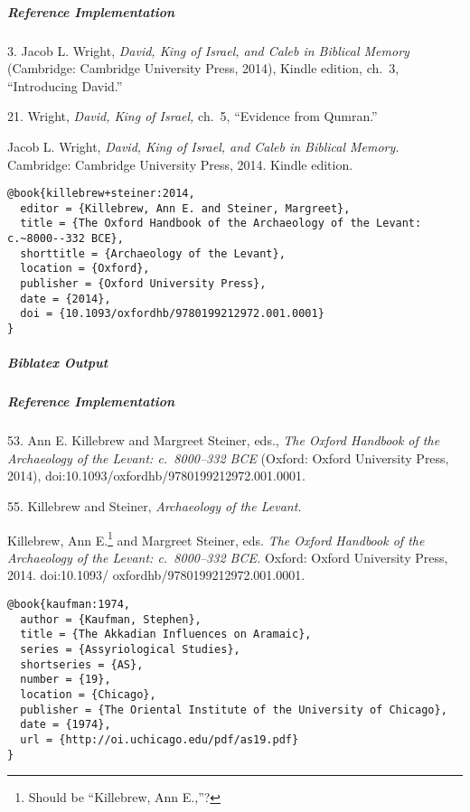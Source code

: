 \documentclass[a4paper]{article}
\newenvironment{biboutput}{%
  \subparagraph{Biblatex Output}
}{\color{black}}
\newenvironment{refimp}{%
  \subparagraph{Reference Implementation}
  \color{reference-colour}
  \rm
}{\par\color{black}}
\begin{document}
\begin{refimp}
  \hspace*{\bibindent}3. Jacob L. Wright, \emph{David, King of Israel, and
  Caleb in Biblical Memory} (Cambridge: Cambridge University Press, 2014),
  Kindle edition, ch.~3, “Introducing David.”

  \hspace*{\bibindent}21. Wright, \emph{David, King of Israel,} ch.~5,
  “Evidence from Qumran.”

  \hangindent\bibindent Jacob L. Wright, \emph{David, King of Israel, and
  Caleb in Biblical Memory.} Cambridge: Cambridge University Press, 2014.
  Kindle edition.
\end{refimp}

\begin{lstlisting}
@book{killebrew+steiner:2014,
  editor = {Killebrew, Ann E. and Steiner, Margreet},
  title = {The Oxford Handbook of the Archaeology of the Levant: c.~8000--332 BCE},
  shorttitle = {Archaeology of the Levant},
  location = {Oxford},
  publisher = {Oxford University Press},
  date = {2014},
  doi = {10.1093/oxfordhb/9780199212972.001.0001}
}
\end{lstlisting}

\begin{biboutput}
\end{biboutput}

\begin{refimp}
  \hspace*{\bibindent}53. Ann E. Killebrew and Margreet Steiner, eds.,
  \emph{The Oxford Handbook of the Archaeology of the Levant: c.~8000–332 BCE}
  (Oxford: Oxford University Press, 2014),
  doi:10.1093/oxfordhb/9780199212972.001.0001.

  \hspace*{\bibindent}55. Killebrew and Steiner, \emph{Archaeology of the
  Levant.}

  \hangindent\bibindent Killebrew, Ann E.\footnote{Should be “Killebrew, Ann
  E.,”?} and Margreet Steiner, eds. \emph{The Oxford Handbook of the
  Archaeology of the Levant: c.~8000–332 BCE.} Oxford: Oxford University
  Press, 2014. doi:10.1093/ oxfordhb/9780199212972.001.0001.
\end{refimp}

\begin{lstlisting}
@book{kaufman:1974,
  author = {Kaufman, Stephen},
  title = {The Akkadian Influences on Aramaic},
  series = {Assyriological Studies},
  shortseries = {AS},
  number = {19},
  location = {Chicago},
  publisher = {The Oriental Institute of the University of Chicago},
  date = {1974},
  url = {http://oi.uchicago.edu/pdf/as19.pdf}
}
\end{lstlisting}
\end{document}

